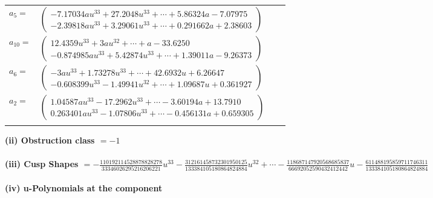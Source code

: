 \documentclass[1p]{elsarticle_modified}
\theoremstyle{definition}
\begin{document}
\begin{tabular}{m{7pt} m{180pt} m{7pt} m{180pt} }
\flushright $a_{5}=$&$\begin{pmatrix}-7.17034 a u^{33}+27.2048 u^{33}+\cdots+5.86324 a-7.07975\\-2.39818 a u^{33}+3.29061 u^{33}+\cdots+0.291662 a+2.38603\end{pmatrix}$ \\
\flushright $a_{10}=$&$\begin{pmatrix}12.4359 u^{33}+3 a u^{32}+\cdots+a-33.6250\\-0.874985 a u^{33}+5.42874 u^{33}+\cdots+1.39011 a-9.26373\end{pmatrix}$ \\
\flushright $a_{6}=$&$\begin{pmatrix}-3 a u^{33}+1.73278 u^{33}+\cdots+42.6932 u+6.26647\\-0.608399 u^{33}-1.49941 u^{32}+\cdots+1.09687 u+0.361927\end{pmatrix}$ \\
\flushright $a_{2}=$&$\begin{pmatrix}1.04587 a u^{33}-17.2962 u^{33}+\cdots-3.60194 a+13.7910\\0.263401 a u^{33}-1.07806 u^{33}+\cdots-0.456131 a+0.659305\end{pmatrix}$\\&\end{tabular}
\flushleft \textbf{(ii) Obstruction class $= -1$}\\~\\
\flushleft \textbf{(iii) Cusp Shapes $= -\frac{110192114528878828278}{33346026295216206221} u^{33}-\frac{312161458732301950125}{133384105180864824884} u^{32}+\cdots-\frac{118687147920568685837}{66692052590432412442} u-\frac{611488195859711746311}{133384105180864824884}$}\\~\\
\newpage\renewcommand{\arraystretch}{1}
\flushleft \textbf{(iv) u-Polynomials at the component}\newline \\
\end{document}
